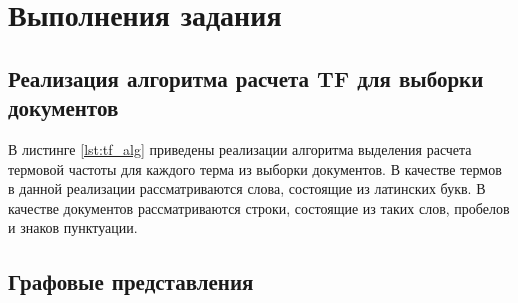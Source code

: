 \chapter{Выполнения задания}

\section{Реализация алгоритма расчета TF для выборки документов}

В листинге \ref{lst:tf_alg} приведены реализации алгоритма выделения расчета термовой частоты для каждого терма из выборки документов. В качестве термов в данной реализации рассматриваются слова, состоящие из латинских букв. В качестве документов рассматриваются строки, состоящие из таких слов, пробелов и знаков пунктуации.

\clearpage



\section{Графовые представления}

